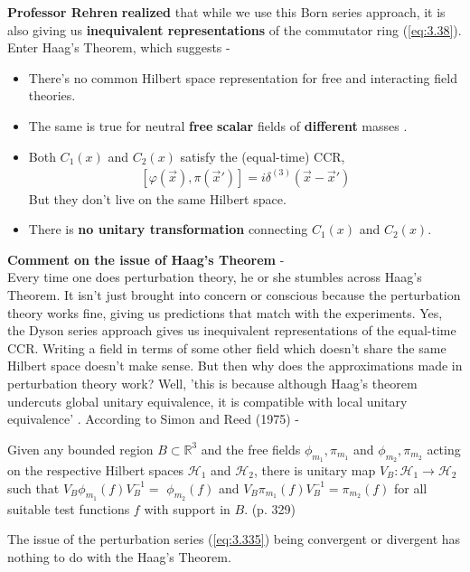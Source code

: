 \documentclass[12pt,a4paper]{article}
\numberwithin{equation}{section}
\begin{document}
\textbf{\textcolor{blue!50!black}{Professor Rehren}} \textbf{\textcolor{blue!50!black}{realized}} that while we use this Born series approach, it is also giving us \textbf{\textcolor{blue!50!black}{inequivalent representations}} of the commutator ring (\ref{eq:3.38}). Enter Haag's Theorem, which suggests - 
\begin{itemize}
\item There's no common Hilbert space representation for free and interacting field theories. 
\item The same is true for neutral \textbf{\textcolor{blue!50!black}{free}} \textbf{\textcolor{blue!50!black}{scalar}} fields of \textbf{\textcolor{blue!50!black}{different}} masses \cite{reed1975ii}.
\item Both $C_1(x)$ and $C_2(x)$ satisfy the (equal-time) CCR, \begin{align}\label{eq:3.38}
[\varphi(\vec{x}),\pi(\vec{x}')]=i\delta^{(3)}(\vec{x}-\vec{x}')
\end{align} But they don't live on the same Hilbert space. 
\item There is \textbf{\textcolor{blue!50!black}{no unitary transformation}} connecting $C_1(x)$ and $C_2(x)$.
\end{itemize}
\textbf{Comment on the issue of Haag's Theorem} - \\
Every time one does perturbation theory, he or she stumbles across Haag's Theorem. It isn't just brought into concern or conscious because the perturbation theory works fine, giving us predictions that match with the experiments. Yes, the Dyson series approach gives us inequivalent representations of the equal-time CCR. Writing a field in terms of some other field which doesn't share the same Hilbert space doesn't make sense. But then why does the approximations made in perturbation theory work? Well, 'this is because although Haag's theorem undercuts global unitary
equivalence, it is compatible with local unitary equivalence' \cite{pittphilsci2673}. According to Simon and Reed (1975) - 
\begin{adjustwidth}{50pt}{50pt}
Given any bounded region $B \subset \mathbb{R}^{3}$ and the free fields $\phi_{m_{1}}, \pi_{m_{1}}$ and $\phi_{m_{2}}, \pi_{m_{2}}$ acting on the respective Hilbert spaces $\mathcal{H}_{1}$ and $\mathcal{H}_{2}$, there is unitary map $V_{B}: \mathcal{H}_{1} \rightarrow \mathcal{H}_{2}$ such that $V_{B} \phi_{m_{1}}(f) V_{B}^{-1}=$
$\phi_{m_{2}}(f)$ and $V_{B} \pi_{m_{1}}(f) V_{B}^{-1}=\pi_{m_{2}}(f)$ for all suitable test functions $f$ with support in $B$. (p. 329)\\
\end{adjustwidth}
The issue of the perturbation series (\ref{eq:3.335}) being convergent or divergent has nothing to do with the Haag's Theorem. 
\end{document}
